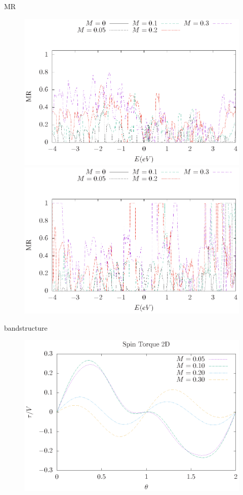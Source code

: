 \documentclass[handout,t]{beamer}
\begin{document}
\begin{frame}{MR}
	\begin{figure}[ht]
		\centering
		\includegraphics[width=0.45\linewidth]{../figures/MR_zig-revise-thesis.eps}
		\includegraphics[width=0.45\linewidth]{../figures/MR-revise-thesis.eps}
	  \end{figure}
\end{frame}

\begin{frame}{bandstructure}
	\begin{figure}[ht]
		\centering
		\includegraphics[width=0.45\linewidth]{../figures/stt-thesis.eps}
	  \end{figure}
\end{frame}
\end{document}
